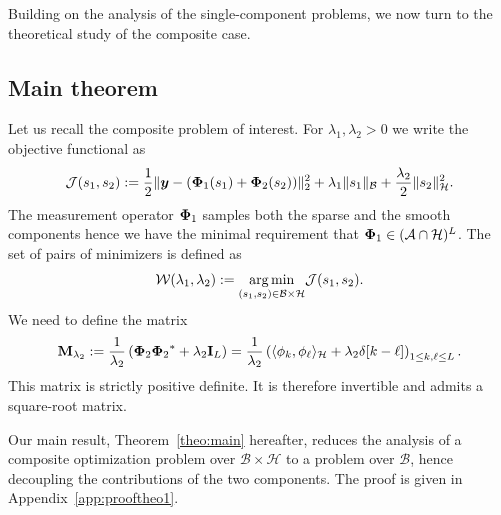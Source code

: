 \documentclass[12pt]{article}
\begin{document}
    Building on the analysis of the single-component problems, we now turn to the theoretical study of the composite case.

    \subsection{Main theorem}

    Let us recall the composite problem of interest. For $\lambda_1, \lambda_2 > 0$ we write the objective functional as
    \begin{equation}
        \label{eq:composite-optim}
        \mathcal{J}(s_1, s_2) := \frac{1}{2} \| \bm{y} - ({\bm{\Phi}_1} (s_1) + {\bm{\Phi}_2} (s_2)) \|_2^2  + \lambda_{1} \| s_1 \|_{\mathcal{B}} + \frac{\lambda_{2}}{2} \| s_2 \|_{\mathcal{H}}^2.
    \end{equation}
    The measurement operator ${\bm{\Phi}_1}$ samples both the sparse and the smooth components hence we have the minimal requirement that ${\bm{\Phi}_1} \in (\mathcal{A} \cap \mathcal{H})^L$. The set of pairs of minimizers is defined as
    \begin{equation} \label{eq:argminisback}
        \mathcal{W} (\lambda_{1},\lambda_{2}) := \underset{(s_1,s_2) \in \mathcal{B} \times \mathcal{H}}{\arg\min} \mathcal{J}(s_1, s_2).
    \end{equation}
    We need to define the matrix
    \begin{equation}
        \label{eq:def-Mphi}
        \mathbf{M}_{\lambda_{2}} := \frac{1}{\lambda_{2}} \left({\bm{\Phi}_2}{\bm{\Phi}_2}^* + \lambda_{2} \mathbf{I}_L\right) = \frac{1}{\lambda_{2}} \left( \langle \phi_k , \phi_\ell \rangle_{\mathcal{H}} + \lambda_{2} \delta[k - \ell] \right)_{1\leq k, \ell \leq L}.
    \end{equation}
    This matrix is strictly positive definite. It is therefore invertible and admits a square-root matrix.

    Our main result, Theorem~\ref{theo:main} hereafter, reduces the analysis of a composite optimization problem over $\mathcal{B}\times\mathcal{H}$ to a problem over $\mathcal{B}$, hence decoupling the contributions of the two components. The proof is given in Appendix~\ref{app:prooftheo1}.
\end{document}
